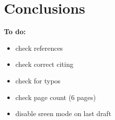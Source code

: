 

\section{Conclusions}
\label{sec:conclusion}

\blindtext

\vspace{1em}

\textbf{To do:}
\begin{itemize}[leftmargin=10pt]
	\item check references
	\item check correct citing
	\item check for typos
	\item check page count (6 pages)
	\item disable sreen mode on last draft
\end{itemize}